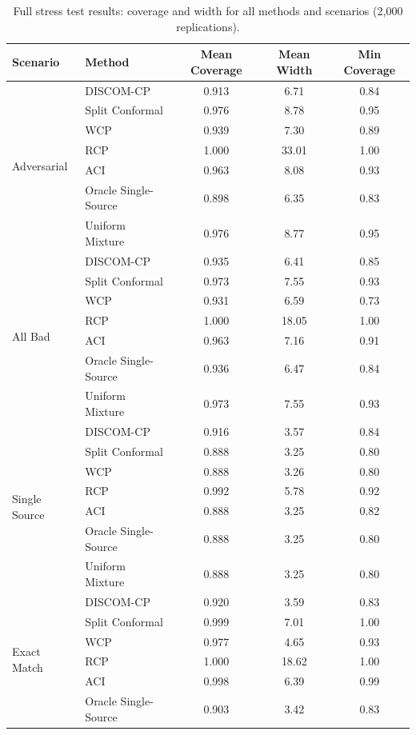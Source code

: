 \documentclass{article}
\newcommand{\DISCOM}{\textsc{DISCOM-CP}}
\begin{document}
\begin{table}[h]
\caption{Full stress test results: coverage and width for all methods and scenarios (2,000 replications).}
\label{tab:stress_full}
\centering
\scriptsize
\begin{tabular}{llccc}
\toprule
\textbf{Scenario} & \textbf{Method} & \textbf{Mean Coverage} & \textbf{Mean Width} & \textbf{Min Coverage} \\
\midrule
\multirow{7}{*}{Adversarial} & \DISCOM{} & 0.913 & 6.71 & 0.84 \\
& Split Conformal & 0.976 & 8.78 & 0.95 \\
& WCP & 0.939 & 7.30 & 0.89 \\
& RCP & 1.000 & 33.01 & 1.00 \\
& ACI & 0.963 & 8.08 & 0.93 \\
& Oracle Single-Source & 0.898 & 6.35 & 0.83 \\
& Uniform Mixture & 0.976 & 8.77 & 0.95 \\
\midrule
\multirow{7}{*}{All Bad} & \DISCOM{} & 0.935 & 6.41 & 0.85 \\
& Split Conformal & 0.973 & 7.55 & 0.93 \\
& WCP & 0.931 & 6.59 & 0.73 \\
& RCP & 1.000 & 18.05 & 1.00 \\
& ACI & 0.963 & 7.16 & 0.91 \\
& Oracle Single-Source & 0.936 & 6.47 & 0.84 \\
& Uniform Mixture & 0.973 & 7.55 & 0.93 \\
\midrule
\multirow{7}{*}{Single Source} & \DISCOM{} & 0.916 & 3.57 & 0.84 \\
& Split Conformal & 0.888 & 3.25 & 0.80 \\
& WCP & 0.888 & 3.26 & 0.80 \\
& RCP & 0.992 & 5.78 & 0.92 \\
& ACI & 0.888 & 3.25 & 0.82 \\
& Oracle Single-Source & 0.888 & 3.25 & 0.80 \\
& Uniform Mixture & 0.888 & 3.25 & 0.80 \\
\midrule
\multirow{7}{*}{Exact Match} & \DISCOM{} & 0.920 & 3.59 & 0.83 \\
& Split Conformal & 0.999 & 7.01 & 1.00 \\
& WCP & 0.977 & 4.65 & 0.93 \\
& RCP & 1.000 & 18.62 & 1.00 \\
& ACI & 0.998 & 6.39 & 0.99 \\
& Oracle Single-Source & 0.903 & 3.42 & 0.83 \\

\end{tabular}
\end{table}
\end{document}
